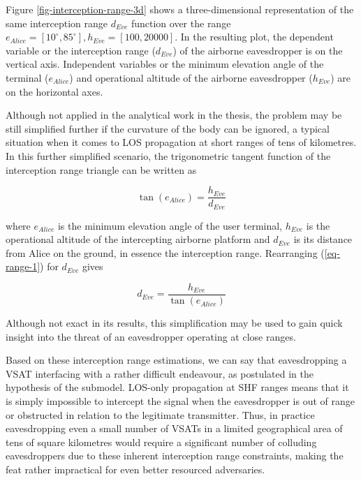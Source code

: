 \documentclass[english, 12pt, a4paper, elec, utf8, a-1b, online]{aaltothesis}
\begin{document}
Figure \ref{fig-interception-range-3d} shows a three-dimensional representation of the same interception range $d_{Eve}$ function over the range $e_{Alice} = [10^\circ, 85^\circ], h_{Eve} = [100,20000]$.
In the resulting plot, the dependent variable or the interception range ($d_{Eve}$) of the airborne eavesdropper is on the vertical axis.
Independent variables or the minimum elevation angle of the terminal ($e_{Alice}$) and operational altitude of the airborne eavesdropper ($h_{Eve}$) are on the horizontal axes.

Although not applied in the analytical work in the thesis, the problem may be still simplified further if the curvature of the body can be ignored, a typical situation when it comes to LOS propagation at short ranges of tens of kilometres.
In this further simplified scenario, the trigonometric tangent function of the interception range triangle can be written as

\begin{equation} \label{eq-range-1}
  \tan(e_{Alice}) = \frac{h_{Eve}}{d_{Eve}}
\end{equation}

\noindent
where $e_{Alice}$ is the minimum elevation angle of the user terminal, $h_{Eve}$ is the operational altitude of the intercepting airborne platform and $d_{Eve}$ is its distance from Alice on the ground, in essence the interception range.
Rearranging (\ref{eq-range-1}) for $d_{Eve}$ gives

\begin{equation} \label{eq-range-2}
  d_{Eve} = \frac{h_{Eve}}{\tan(e_{Alice})}
\end{equation}

Although not exact in its results, this simplification may be used to gain quick insight into the threat of an eavesdropper operating at close ranges.

Based on these interception range estimations, we can say that eavesdropping a VSAT interfacing with a rather difficult endeavour, as postulated in the hypothesis of the submodel.
LOS-only propagation at SHF ranges means that it is simply impossible to intercept the signal when the eavesdropper is out of range or obstructed in relation to the legitimate transmitter.
Thus, in practice eavesdropping even a small number of VSATs in a limited geographical area of tens of square kilometres would require a significant number of colluding eavesdroppers due to these inherent interception range constraints, making the feat rather impractical for even better resourced adversaries.
\end{document}
